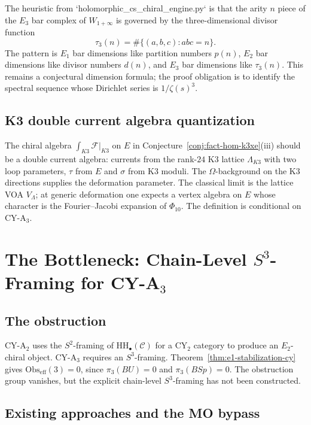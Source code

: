 \documentclass[11pt]{article}
\newcommand{\cC}{\mathcal{C}}
\newcommand{\HH}{\mathrm{HH}}
\theoremstyle{plain}
\theoremstyle{definition}
\theoremstyle{remark}
\begin{document}
The heuristic from `holomorphic_cs_chiral_engine.py` is that the arity
$n$ piece of the $E_3$ bar complex of $W_{1+\infty}$ is governed by
the three-dimensional divisor function
\[
 \tau_3(n)=\#\{(a,b,c):abc=n\}.
\]
The pattern is $E_1$ bar dimensions like partition numbers $p(n)$,
$E_2$ bar dimensions like divisor numbers $d(n)$, and $E_3$ bar
dimensions like $\tau_3(n)$. This remains a conjectural dimension
formula; the proof obligation is to identify the spectral sequence
whose Dirichlet series is $1/\zeta(s)^3$.

\subsection{K3 double current algebra quantization}
The chiral algebra $\int_{K3}\mathcal F|_{K3}$ on $E$ in
Conjecture~\ref{conj:fact-hom-k3xe}(iii) should be a double current
algebra: currents from the rank-$24$ K3 lattice $\Lambda_{K3}$ with two
loop parameters, $\tau$ from $E$ and $\sigma$ from K3 moduli. The
$\Omega$-background on the K3 directions supplies the deformation
parameter. The classical limit is the lattice VOA $V_\Lambda$; at
generic deformation one expects a vertex algebra on $E$ whose character
is the Fourier--Jacobi expansion of $\Phi_{10}$. The definition is
conditional on CY-A$_3$.

\section{The Bottleneck: Chain-Level $S^3$-Framing for CY-A$_3$}

\subsection{The obstruction}
CY-A$_2$ uses the $S^2$-framing of $\HH_\bullet(\cC)$ for a CY$_2$
category to produce an $E_2$-chiral object. CY-A$_3$ requires an
$S^3$-framing. Theorem~\ref{thm:e1-stabilization-cy} gives
$\mathrm{Obs}_{\mathrm{eff}}(3)=0$, since
$\pi_3(BU)=0$ and $\pi_3(BSp)=0$. The obstruction group vanishes, but
the explicit chain-level $S^3$-framing has not been constructed.

\subsection{Existing approaches and the MO bypass}
\end{document}
